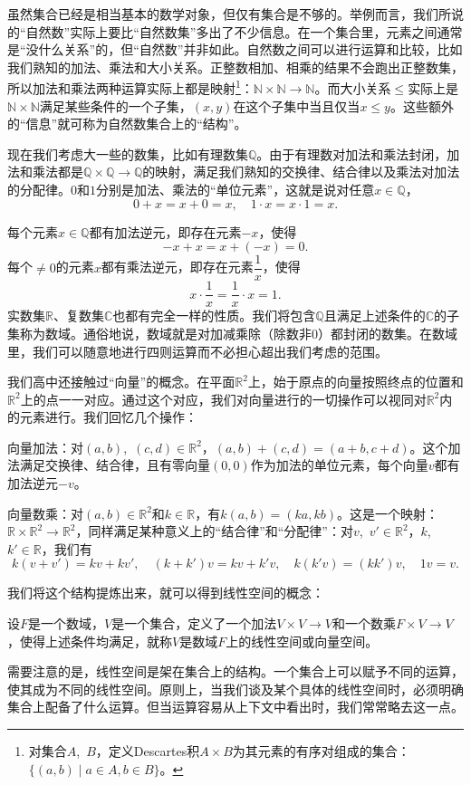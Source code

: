 虽然集合已经是相当基本的数学对象，但仅有集合是不够的。举例而言，我们所说的“自然数”实际上要比“自然数集”多出了不少信息。在一个集合里，元素之间通常是“没什么关系”的，但“自然数”并非如此。自然数之间可以进行运算和比较，比如我们熟知的加法、乘法和大小关系。正整数相加、相乘的结果不会跑出正整数集，所以加法和乘法两种运算实际上都是映射\footnote{对集合$A$,~$B$，定义Descartes积$A\times B$为其元素的有序对组成的集合：$\{(a,b)\mid a\in A,b\in B\}$。
}：$ \mathbb{N}\times\mathbb{N}\to \mathbb{N}$。而大小关系$\leq$实际上是$\mathbb{N}\times\mathbb{N}$满足某些条件的一个子集，$(x,y)$在这个子集中当且仅当$x\leq y$。这些额外的“信息”就可称为自然数集合上的“结构”。

现在我们考虑大一些的数集，比如有理数集$\mathbb{Q}$。由于有理数对加法和乘法封闭，加法和乘法都是$\mathbb{Q}\times\mathbb{Q}\to\mathbb{Q}$的映射，满足我们熟知的交换律、结合律以及乘法对加法的分配律。$0$和$1$分别是加法、乘法的“单位元素”，这就是说对任意$x\in\mathbb{Q}$，
\[0+x=x+0=x,\quad 1\cdot x=x\cdot 1=x. \]

每个元素$x\in\mathbb{Q}$都有加法逆元，即存在元素$-x$，使得\[-x+x=x+(-x)=0.\]每个$\neq 0$的元素$x$都有乘法逆元，即存在元素$\dfrac 1x$，使得\[x\cdot \dfrac{1}{x}=\dfrac{1}{x}\cdot x=1.\]实数集$\mathbb{R}$、复数集$\mathbb{C}$也都有完全一样的性质。我们将包含$\mathbb{Q}$且满足上述条件的$\mathbb{C}$的子集称为数域。通俗地说，数域就是对加减乘除（除数非$0$）都封闭的数集。在数域里，我们可以随意地进行四则运算而不必担心超出我们考虑的范围。

我们高中还接触过“向量”的概念。在平面$\mathbb{R}^2$上，始于原点的向量按照终点的位置和$\mathbb{R}^2$上的点一一对应。通过这个对应，我们对向量进行的一切操作可以视同对$\mathbb{R}^2$内的元素进行。我们回忆几个操作：

向量加法：对$(a,b)$,~$(c,d)\in\mathbb{R}^2$，$(a,b)+(c,d)=(a+b,c+d)$。这个加法满足交换律、结合律，且有零向量$(0,0)$作为加法的单位元素，每个向量$v$都有加法逆元$-v$。

向量数乘：对$(a,b)\in\mathbb{R}^2$和$k\in\mathbb{R}$，有$k (a,b)=(ka,kb)$。这是一个映射：$\mathbb{R}\times\mathbb{R}^2\to\mathbb{R}^2$，同样满足某种意义上的“结合律”和“分配律”：对$v$,~$v'\in \mathbb{R}^2$，$k$,~$k'\in\mathbb{R}$，我们有
\[k(v+v')=kv+kv',\quad (k+k')v=kv+k'v,\quad k(k'v)=(kk')v,\quad 1v=v.\]

我们将这个结构提炼出来，就可以得到线性空间的概念：

设$F$是一个数域，$V$是一个集合，定义了一个加法$V\times V\to V$和一个数乘$F\times V\to V$，使得上述条件均满足，就称$V$是数域$F$上的线性空间或向量空间。

需要注意的是，线性空间是架在集合上的结构。一个集合上可以赋予不同的运算，使其成为不同的线性空间。原则上，当我们谈及某个具体的线性空间时，必须明确集合上配备了什么运算。但当运算容易从上下文中看出时，我们常常略去这一点。

